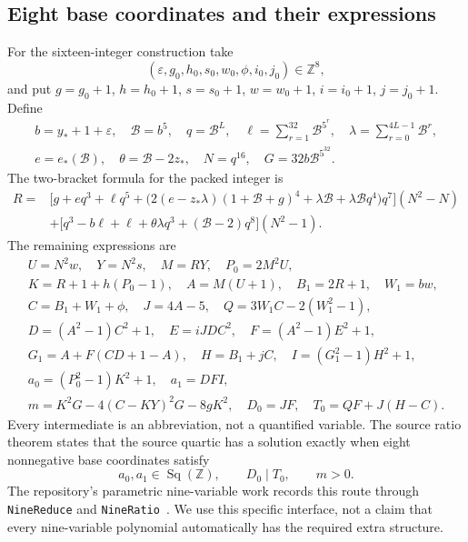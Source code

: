 \documentclass[11pt]{article}
\theoremstyle{definition}\newtheorem{definition}[theorem]{Definition}
\newcommand{\Z}{\mathbb Z}\newcommand{\N}{\mathbb N}\newcommand{\Q}{\mathbb Q}
\newcommand{\Sq}{\operatorname{Sq}(\Z)}
\begin{document}
\subsection{Eight base coordinates and their expressions}
For the sixteen-integer construction take
\[
 (\varepsilon,g_0,h_0,s_0,w_0,\phi,i_0,j_0)\in\Z^8,
\]
and put $g=g_0+1$, $h=h_0+1$, $s=s_0+1$, $w=w_0+1$, $i=i_0+1$, $j=j_0+1$. Define
\begin{gather*}
 b=y_*+1+\varepsilon,\quad \mathcal B=b^5,\quad q=\mathcal B^L,
 \quad\ell=\sum_{r=1}^{32}\mathcal B^{5^r},
 \quad\lambda=\sum_{r=0}^{4L-1}\mathcal B^r,\\
 e=e_*(\mathcal B),\quad\theta=\mathcal B-2z_*,\quad
 N=q^{16},\quad G=32b\mathcal B^{5^{32}}.
\end{gather*}
The two-bracket formula for the packed integer is
\begin{align}
 R={}&\bigl[g+eq^3+\ell q^5+
 \bigl(2(e-z_*\lambda)(1+\mathcal B+g)^4
       +\lambda\mathcal B+\lambda\mathcal Bq^4\bigr)q^7\bigr](N^2-N)
 \nonumber\\
 &+\bigl[q^3-b\ell+\ell+\theta\lambda q^3+
             (\mathcal B-2)q^8\bigr](N^2-1).\label{eq:R}
\end{align}
The remaining expressions are
\begin{gather*}
 U=N^2w,\quad Y=N^2s,\quad M=RY,\quad P_0=2M^2U,\\
 K=R+1+h(P_0-1),\quad A=M(U+1),\quad B_1=2R+1,\quad W_1=bw,\\
 C=B_1+W_1+\phi,\quad J=4A-5,\quad Q=3W_1C-2(W_1^2-1),\\
 D=(A^2-1)C^2+1,\quad E=iJDC^2,\quad F=(A^2-1)E^2+1,\\
 G_1=A+F(CD+1-A),\quad H=B_1+jC,\quad I=(G_1^2-1)H^2+1,\\
 a_0=(P_0^2-1)K^2+1,\quad a_1=DFI,\\
 m=K^2G-4(C-KY)^2G-8gK^2,\quad D_0=JF,\quad T_0=QF+J(H-C).
\end{gather*}
Every intermediate is an abbreviation, not a quantified variable. The source ratio theorem states that the source quartic has a solution exactly when eight nonnegative base coordinates satisfy
\begin{equation}\label{eq:JR}
 a_0,a_1\in\Sq,\qquad D_0\mid T_0,\qquad m>0.
 \tag{JR}
\end{equation}
The repository's parametric nine-variable work records this route through \texttt{NineReduce} and \texttt{NineRatio}~\cite{ninelean}. We use this specific interface, not a claim that every nine-variable polynomial automatically has the required extra structure.
\end{document}

